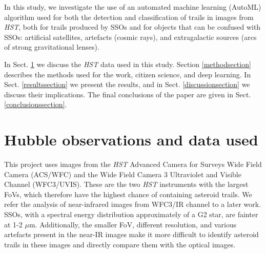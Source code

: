 \documentclass{aa}
\begin{document}
In this study, we investigate the use of an automated machine learning (AutoML) algorithm used for both the detection and classification of trails in images from \textit{HST}, both for trails produced by SSOs and for objects that can be confused with SSOs: artificial satellites, artefacts (cosmic rays), and extragalactic sources (arcs of strong gravitational lenses).

In Sect. \ref{datasection} we discuss the \textit{HST} data used in this study. Section \ref{methodsection} describes the methods used for the work, citizen science, and deep learning. In Sect. \ref{resultssection} we present the results, and in Sect. \ref{discussionsection} we discuss their implications. The final conclusions of the paper are given in Sect. \ref{conclusionssection}.
 
\section{Hubble observations and data used}
\label{datasection}

This project uses images from the \textit{HST} Advanced Camera for Surveys Wide Field Camera (ACS/WFC) and the Wide Field Camera 3 Ultraviolet and Visible Channel (WFC3/UVIS). These are the two \textit{HST} instruments with the largest FoVs, which therefore have the highest chance of containing asteroid trails. We refer the analysis of near-infrared images from WFC3/IR channel to a later work. SSOs, with a spectral energy distribution approximately of a G2 star, are fainter at 1-2 $\mu$m. Additionally, the smaller FoV, different resolution, and various artefacts present in the near-IR images make it more difficult to identify asteroid trails in these images and directly compare them with the optical images.
\end{document}
